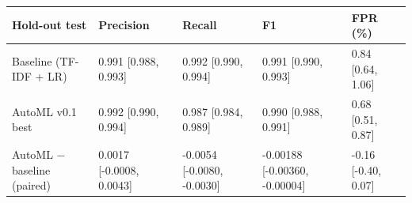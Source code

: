\begin{tabular}{lllll}
\toprule
Hold-out test & Precision & Recall & F1 & FPR (\%) \\
\midrule
Baseline (TF-IDF + LR) & 0.991 [0.988, 0.993] & 0.992 [0.990, 0.994] & 0.991 [0.990, 0.993] & 0.84 [0.64, 1.06] \\
AutoML v0.1 best & 0.992 [0.990, 0.994] & 0.987 [0.984, 0.989] & 0.990 [0.988, 0.991] & 0.68 [0.51, 0.87] \\
\midrule
AutoML $-$ baseline (paired) & 0.0017 [-0.0008, 0.0043] & -0.0054 [-0.0080, -0.0030] & -0.00188 [-0.00360, -0.00004] & -0.16 [-0.40, 0.07] \\
\bottomrule
\end{tabular}